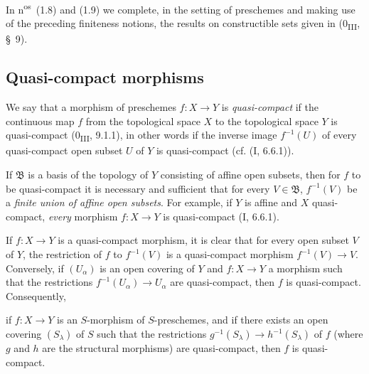 In n\textsuperscript{os}~(1.8) and (1.9) we complete, in the setting of
preschemes and making use of the preceding finiteness notions, the
results on constructible sets given in
(0\textsubscript{III}, §~9).

\subsection{Quasi-compact morphisms}
\label{subsection:IV.1.1}

\begin{definition}[1.1.1]
\label{IV.1.1.1}
We say that a morphism of preschemes $f:X\to Y$ is \emph{quasi-compact} if
the continuous map $f$ from the topological space $X$ to the topological
space $Y$ is quasi-compact (0\textsubscript{III}, 9.1.1), in other
words if the inverse image $f^{-1}(U)$ of every quasi-compact open subset $U$
of $Y$ is quasi-compact (cf. (I, 6.6.1)).
\end{definition}

If $\mathfrak B$ is a basis of the topology of $Y$ consisting of affine open
subsets, then for $f$ to be quasi-compact it is necessary and sufficient that
for every $V\in\mathfrak B$, $f^{-1}(V)$ be a \emph{finite union of affine
open subsets}. For example, if $Y$ is affine and $X$ quasi-compact,
\emph{every} morphism $f:X\to Y$ is quasi-compact (I, 6.6.1).

If $f:X\to Y$ is a quasi-compact morphism, it is clear that for every
open subset $V$ of $Y$, the restriction of $f$ to $f^{-1}(V)$ is a
quasi-compact morphism $f^{-1}(V)\to V$. Conversely, if $(U_\alpha)$ is an
open covering of $Y$ and $f:X\to Y$ a morphism such that the restrictions
$f^{-1}(U_\alpha)\to U_\alpha$ are quasi-compact, then $f$ is
quasi-compact. Consequently,


if $f:X\to Y$ is an $S$-morphism of $S$-preschemes, and if there exists
an open covering $(S_\lambda)$ of $S$ such that the restrictions
$g^{-1}(S_\lambda)\to h^{-1}(S_\lambda)$ of $f$ (where $g$ and $h$ are the
structural morphisms) are quasi-compact, then $f$ is quasi-compact.

